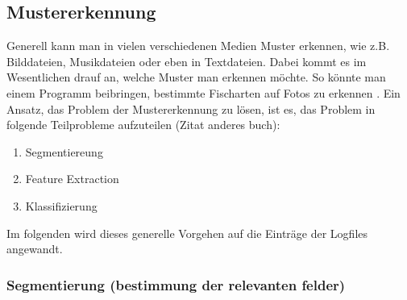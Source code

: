 \subsection{Mustererkennung}
\label{sub:Mustererkennung}
	Generell kann man in vielen verschiedenen Medien Muster erkennen, wie z.B. Bilddateien, Musikdateien oder eben in Textdateien. Dabei kommt es im Wesentlichen drauf an, welche Muster man erkennen möchte. So könnte man einem Programm beibringen, bestimmte Fischarten auf Fotos zu erkennen \citep{DuHaSt01}. Ein Ansatz, das Problem der Mustererkennung zu lösen, ist es, das Problem in folgende Teilprobleme aufzuteilen (Zitat anderes buch):
\begin{enumerate}
	\item Segmentiereung
	\item Feature Extraction
	\item Klassifizierung
\end{enumerate}
Im folgenden wird dieses generelle Vorgehen auf die Einträge der Logfiles angewandt.

\subsubsection{Segmentierung (bestimmung der relevanten felder)}
\label{ssub:Segmentierung}

